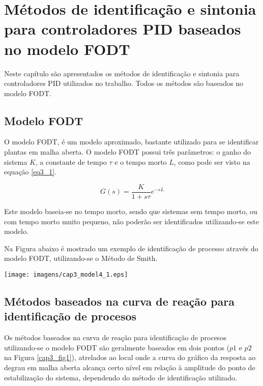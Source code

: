 \chapter{Métodos de identificação e sintonia para controladores PID
    baseados no modelo FODT \label{cap:metodos-de-identificacao-e-sintonia}}

Neste capítulo são apresentados os métodos de identificação e sintonia
para controladores PID utilizados no trabalho. Todos os métodos são
baseados no modelo FODT.

\section{Modelo FODT}

    O modelo \ac{FODT}, é um modelo aproximado, bastante utilizado para se
    identificar plantas em malha aberta. O modelo \acs{FODT}
    possui três parâmetros: o ganho do sistema $K$, a constante de tempo $\tau$
    e o tempo morto $L$, como pode ser visto na equação \ref{eq3_1}.

    \begin{equation}
        G(s) = \frac{K}{1 + s\tau} e^{-sL}
        \label{eq3_1}
    \end{equation}

    Este modelo baseia-se no tempo morto, sendo que sistemas sem tempo morto,
    ou com tempo morto muito pequeno, não poderão ser identificados utilizando-se
    este modelo.

    Na Figura abaixo é mostrado um exemplo de identificação de processo através
    do modelo \ac{FODT}, utilizando-se o Método de Smith.

    \begin{center}
        \label{cap3_fig1}
        \texttt{[image: imagens/cap3\_model4\_1.eps]}
    \end{center}

\section{Métodos baseados na curva de reação para identificação de procesos}

    Os métodos baseados na curva de reação para identificação de procesos
    utilizando-se o modelo \acs{FODT} são geralmente baseados em dois pontos
    ($p1$ e $p2$ na Figura \ref{cap3_fig1}), atrelados ao local onde a curva
    do gráfico da resposta ao degrau em malha aberta alcança certo nível em
    relação à amplitude do ponto de estabilização do sistema, dependendo do
    método de identificação utilizado.
    
